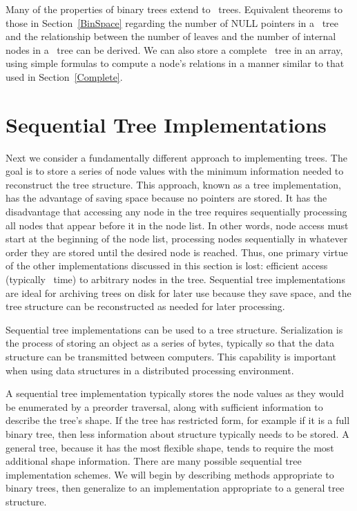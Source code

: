 Many of the properties of binary trees extend to \Kary\ trees.
Equivalent theorems to those in Section~\ref{BinSpace} regarding the
number of NULL pointers in a \Kary\ tree and the relationship between
the number of leaves and the number of internal nodes in a
\Kary\ tree can be derived.
We can also store a complete \Kary\ tree in an array,
using simple formulas to compute a node's relations in a manner
similar to that used in
Section~\ref{Complete}.

\section{Sequential Tree Implementations}
\label{DFExpr}

Next we consider a fundamentally different approach to implementing
trees.
The goal is to store a series of node values with the minimum
information needed to reconstruct the tree structure.
This approach, known as a  tree implementation, has
the advantage of saving space because no pointers are stored.
It has the disadvantage that accessing any node in the tree requires
sequentially processing all nodes that appear before 
it in the node list.
In other words, node access must start at the beginning of the node
list, processing nodes sequentially in whatever order they are stored
until the desired node is reached.
Thus, one primary virtue of the other implementations discussed in
this section is lost: efficient access (typically \Thetalogn\ time) to
arbitrary nodes in the tree.
Sequential tree implementations are ideal for archiving trees on disk
for later use because they save space, and the tree structure can
be reconstructed as needed for later processing.

Sequential tree implementations can be used to  a 
tree structure.
Serialization is the process of storing an object as a series of
bytes, typically so that the data structure can be transmitted between
computers.
This capability is important when using data structures in a
distributed processing environment.

A sequential tree implementation typically stores the node values as
they would be enumerated by a preorder
traversal, along with sufficient information to describe the tree's
shape.
If the tree has restricted form, for example if it is a full binary
tree, then less information about structure typically needs to be
stored.
A general tree, because it has the most flexible shape, tends to require
the most additional shape information. 
There are many possible sequential tree implementation schemes.
We will begin by describing methods appropriate to binary trees,
then generalize to an implementation appropriate to a general tree
structure.

